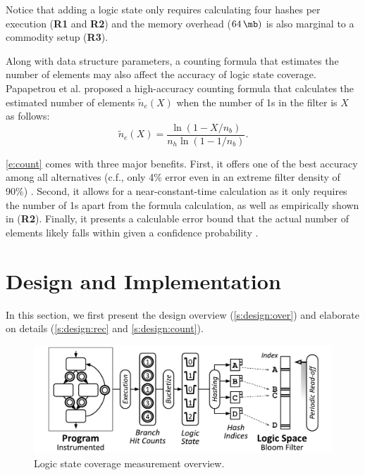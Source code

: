 \documentclass[letterpaper,twocolumn,10pt]{article}
\begin{document}
Notice that adding a logic state only requires calculating four hashes per
execution (\textbf{R1} and \textbf{R2}) and the memory overhead ($\SI{64}{\mb})$
is also marginal to a commodity setup (\textbf{R3}). 


%
Along with data structure parameters, a counting formula that estimates the
number of elements may also affect the accuracy of logic state coverage.
Papapetrou et al. \cite{papapetrou2010cardinality} proposed a high-accuracy
counting formula that calculates the estimated number of elements
$\tilde{n}_e(X)$ when the number of 1s in the filter is $X$ as follows:
%
\begin{equation}
  \tilde{n}_e(X) = \frac{\ln{(1-X/n_b)}}{n_h \ln{(1-1/n_b)}}.
  \label{e:count}
\end{equation}

\autoref{e:count} comes with three major benefits. First, it offers one of the
best accuracy among all alternatives (c.f., only 4\% error even in an extreme
filter density of 90\%) \cite{harmouch2017cardinality}. 
%
Second, it allows for a near-constant-time calculation as it only requires the
number of 1s apart from the formula calculation, as well as empirically shown in
\cite{harmouch2017cardinality} (\textbf{R2}). 
%
Finally, it presents a calculable error bound that the actual number of elements
likely falls within given a confidence probability \cite{papapetrou2010cardinality}.



\section{Design and Implementation}
\label{s:design}

In this section, we first present the design overview (\autoref{s:design:over})
and elaborate on details (\autoref{s:design:rec} and \ref{s:design:count}).


\begin{figure}[t]
  \centering
  \includegraphics[width=\columnwidth]{images/design.pdf}
  \caption{Logic state coverage measurement overview.}
  \label{f:design}
\end{figure}
\end{document}
